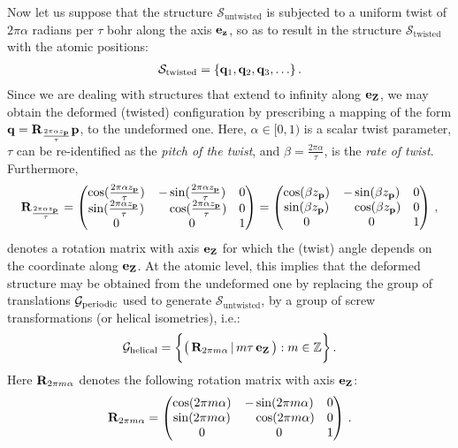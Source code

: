 \documentclass[preprint,12pt, 3p, sort&compress]{elsarticle}
\begin{document}
Now let us  suppose that the structure $\mathcal{S}_{\text{untwisted}}$ is subjected to a uniform twist of $2\pi \alpha$ radians per $\tau$ bohr along the axis ${\bf e}_{{\bf z}}$, so as to result in the structure $\mathcal{S}_{\text{twisted}}$ with the atomic positions:
\begin{align}
\mathcal{S}_{\text{twisted}} = \{{\bf q}_1,  {\bf q}_2, {\bf q}_3,\ldots \}\,.
\end{align}
Since we are dealing with structures that extend to infinity along ${\bf e}_{{\bf Z}}$, we may obtain the deformed (twisted) configuration by prescribing a mapping of the form ${\bf q} = \displaystyle{{{\bf R}}_{\frac{2\pi \alpha z_{{\bf p}}}{\tau}}} {\bf p}$, to the undeformed one. Here, $\alpha \in [0,1)$ is a scalar twist parameter, $\tau$ can be re-identified as the \textit{pitch of the twist}, and $\beta = {\frac{2\pi \alpha}{\tau}}$, is the \textit{rate of twist}. Furthermore,
\begin{align}
{{{\bf R}}_{\frac{2\pi \alpha z_{{\bf p}}}{\tau}}} = \begin{pmatrix}
\cos (\frac{2\pi \alpha z_{{\bf p}}}{\tau})  & -\sin (\frac{2\pi \alpha z_{{\bf p}}}{\tau})  & 0 \\
\sin (\frac{2\pi \alpha z_{{\bf p}}}{\tau})  & \quad\cos (\frac{2\pi \alpha z_{{\bf p}}}{\tau})  & 0 \\
0 & 0 & 1
\end{pmatrix}
= \begin{pmatrix}
\cos (\beta  z_{{\bf p}})  & -\sin (\beta  z_{{\bf p}})  & 0 \\
\sin (\beta  z_{{\bf p}})  & \quad\cos (\beta  z_{{\bf p}})  & 0 \\
0 & 0 & 1
\end{pmatrix}\,,
\end{align} 
denotes a rotation matrix with axis ${\bf e}_{{\bf Z}}$ for which the (twist) angle depends on the coordinate along ${\bf e}_{{\bf Z}}$. At the atomic level, this implies \citep{James_OS, Dumitrica_James_OMD, banerjee2021ab} that the deformed structure may be obtained from the undeformed one by replacing the group of translations ${\cal G}_{\text{periodic}}$ used to generate $\mathcal{S}_{\text{untwisted}}$, by a group of screw transformations (or helical isometries), i.e.:
\begin{align}
{\cal G}_{\text{helical}} = \bigg\{\big(\,{{\bf R}}_{{2\pi m \alpha}} \,|\,m\tau\,{\bf e}_{{\bf Z}}\,\big) : m \in \mathbb{Z}\bigg\}\,.
\end{align}
Here ${\bf R}_{2\pi m\alpha}$ denotes the following rotation matrix with axis ${\bf e}_{{\bf Z}}$: 
\begin{align}
{{\bf R}_{2\pi m\alpha}} = 
\begin{pmatrix}
\cos (2\pi m\alpha)  & -\sin (2\pi m\alpha)  & 0 \\
\sin (2\pi m\alpha)  & \quad\cos (2\pi m\alpha)  & 0 \\
0 & 0 & 1
\end{pmatrix}\,.
\end{align}
\end{document}
